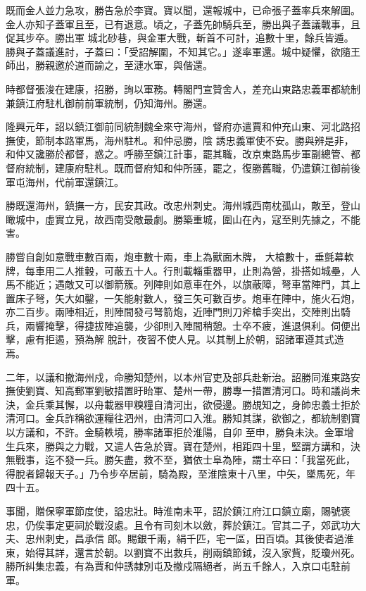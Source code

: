 \begin{pinyinscope}
 既而金人並力急攻，勝告急於李寶。寶以聞，還報城中，已命張子蓋率兵來解圍。金人亦知子蓋軍且至，已有退意。頃之，子蓋先帥騎兵至，勝出與子蓋議戰事，且促其步卒。勝出軍
 城北砂巷，與金軍大戰，斬首不可計，追數十里，餘兵皆遁。勝與子蓋議進討，子蓋曰：「受詔解圍，不知其它。」遂率軍還。城中疑懼，欲隨王師出，勝親邀於道而諭之，至漣水軍，與偕還。



 時都督張浚在建康，招勝，詢以軍務。轉閣門宣贊舍人，差充山東路忠義軍都統制兼鎮江府駐札御前前軍統制，仍知海州。勝還。



 隆興元年，詔以鎮江御前同統制魏全來守海州，督府亦遣賈和仲充山東、河北路招撫使，節制本路軍馬，海州駐札。和仲忌勝，陰
 誘忠義軍使不安。勝與辨是非，和仲又讒勝於都督，惑之。呼勝至鎮江計事，罷其職，改京東路馬步軍副總管、都督府統制，建康府駐札。既而督府知和仲所誣，罷之，復勝舊職，仍遣鎮江御前後軍屯海州，代前軍還鎮江。



 勝既還海州，鎮撫一方，民安其政。改忠州刺史。海州城西南枕孤山，敵至，登山瞰城中，虛實立見，故西南受敵最劇。勝築重城，圍山在內，寇至則先據之，不能害。



 勝嘗自創如意戰車數百兩，炮車數十兩，車上為獸面木牌，
 大槍數十，垂氈幕軟牌，每車用二人推轂，可蔽五十人。行則載輜重器甲，止則為營，掛搭如城壘，人馬不能近；遇敵又可以御箭簇。列陣則如意車在外，以旗蔽障，弩車當陣門，其上置床子弩，矢大如鑿，一矢能射數人，發三矢可數百步。炮車在陣中，施火石炮，亦二百步。兩陣相近，則陣間發弓弩箭炮，近陣門則刀斧槍手突出，交陣則出騎兵，兩響掩擊，得捷拔陣追襲，少卻則入陣間稍憩。士卒不疲，進退俱利。伺便出擊，慮有拒遏，預為解
 脫計，夜習不使人見。以其制上於朝，詔諸軍遵其式造焉。



 二年，以議和撤海州戍，命勝知楚州，以本州官吏及部兵赴新治。詔勝同淮東路安撫使劉寶、知高郵軍劉敏措置盱眙軍、楚州一帶，勝專一措置清河口。時和議尚未決，金兵乘其懈，以舟載器甲糗糧自清河出，欲侵邊。勝覘知之，身帥忠義士拒於清河口。金兵詐稱欲運糧往泗州，由清河口入淮。勝知其謀，欲御之，都統制劉寶以方議和，不許。金騎軼境，勝率諸軍拒於淮陽，自卯
 至申，勝負未決。金軍增生兵來，勝與之力戰，又遣人告急於寶。寶在楚州，相距四十里，堅謂方講和，決無戰事，迄不發一兵。勝矢盡，救不至，猶依士阜為陣，謂士卒曰：「我當死此，得脫者歸報天子。」乃令步卒居前，騎為殿，至淮陰東十八里，中矢，墜馬死，年四十五。



 事聞，贈保寧軍節度使，謚忠壯。時淮南未平，詔於鎮江府江口鎮立廟，賜號褒忠，仍俟事定更祠於戰沒處。且令有司刻木以斂，葬於鎮江。官其二子，郊武功大夫、忠州刺史，昌承信
 郎。賜銀千兩，絹千匹，宅一區，田百頃。其後使者過淮東，始得其詳，還言於朝。以劉寶不出救兵，削兩鎮節鉞，沒入家貲，貶瓊州死。勝所糾集忠義，有為賈和仲誘隸別屯及撤戍隔絕者，尚五千餘人，入京口屯駐前軍。




\end{pinyinscope}
